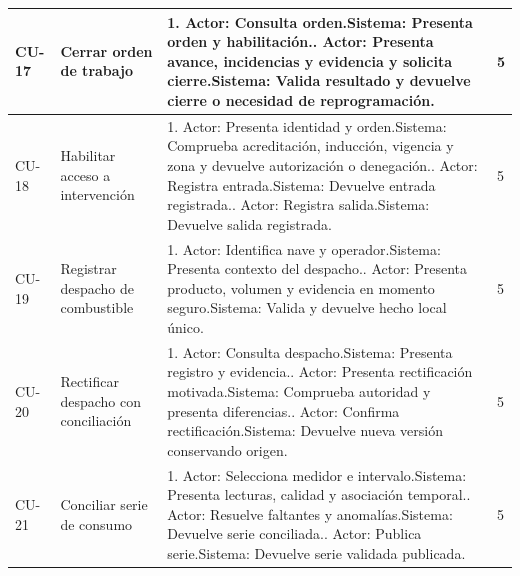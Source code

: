 \begin{longtable}{L{14mm}L{27mm}L{97mm}R{9mm}}
CU-17 & Cerrar orden de trabajo & 1. Actor: Consulta orden.\newline Sistema: Presenta orden y habilitación.. Actor: Presenta avance, incidencias y evidencia y solicita cierre.\newline Sistema: Valida resultado y devuelve cierre o necesidad de reprogramación. & 5\\\hline
CU-18 & Habilitar acceso a intervención & 1. Actor: Presenta identidad y orden.\newline Sistema: Comprueba acreditación, inducción, vigencia y zona y devuelve autorización o denegación.. Actor: Registra entrada.\newline Sistema: Devuelve entrada registrada.. Actor: Registra salida.\newline Sistema: Devuelve salida registrada. & 5\\\hline
CU-19 & Registrar despacho de combustible & 1. Actor: Identifica nave y operador.\newline Sistema: Presenta contexto del despacho.. Actor: Presenta producto, volumen y evidencia en momento seguro.\newline Sistema: Valida y devuelve hecho local único. & 5\\\hline
CU-20 & Rectificar despacho con conciliación & 1. Actor: Consulta despacho.\newline Sistema: Presenta registro y evidencia.. Actor: Presenta rectificación motivada.\newline Sistema: Comprueba autoridad y presenta diferencias.. Actor: Confirma rectificación.\newline Sistema: Devuelve nueva versión conservando origen. & 5\\\hline
CU-21 & Conciliar serie de consumo & 1. Actor: Selecciona medidor e intervalo.\newline Sistema: Presenta lecturas, calidad y asociación temporal.. Actor: Resuelve faltantes y anomalías.\newline Sistema: Devuelve serie conciliada.. Actor: Publica serie.\newline Sistema: Devuelve serie validada publicada. & 5\\\hline

\end{longtable}
